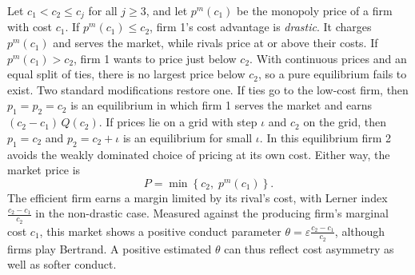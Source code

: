  Let $c_1 < c_2 \le c_j$ for all $j \ge 3$, and let $p^m(c_1)$ be the monopoly price of a
firm with cost $c_1$. If $p^m(c_1) \le c_2$, firm 1's cost advantage is \emph{drastic}. It charges $p^m(c_1)$ and
serves the market, while rivals price at or above their costs. If $p^m(c_1) > c_2$, firm 1 wants to price just below
$c_2$. With continuous prices and an equal split of ties, there is no largest price below $c_2$, so a pure
equilibrium fails to exist. Two standard modifications restore one. If ties go to the low-cost firm, then
$p_1 = p_2 = c_2$ is an equilibrium in which firm 1 serves the market and earns $(c_2 - c_1)\, Q(c_2)$. If prices lie
on a grid with step $\iota$ and $c_2$ on the grid, then $p_1 = c_2$ and $p_2 = c_2 + \iota$ is an equilibrium for
small $\iota$. In this equilibrium firm 2 avoids the weakly dominated choice of pricing at its own cost. Either way, the market price
is
\begin{equation*}
P = \min\left\{c_2,\; p^m(c_1)\right\}.
\end{equation*}
The efficient firm earns a margin limited by its rival's cost, with Lerner index $\frac{c_2 - c_1}{c_2}$ in the
non-drastic case. Measured against the producing firm's marginal cost $c_1$, this market shows a positive conduct
parameter $\theta = \varepsilon\frac{c_2 - c_1}{c_2}$, although firms play Bertrand. A positive estimated $\theta$ can
thus reflect cost asymmetry as well as softer conduct.

